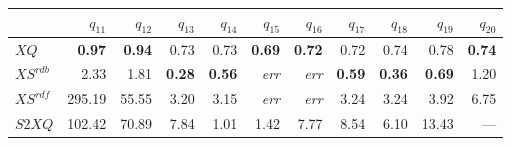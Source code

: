 \begin{tabular}{lrrrrrrrrrr}
\toprule
  & $q_{11}$ & $q_{12}$ & $q_{13}$ & $q_{14}$ & $q_{15}$ & $q_{16}$ & $q_{17}$ & $q_{18}$ & $q_{19}$ & $q_{20}$ \\
\midrule
$\mathit{XQ}$        & \textbf{0.97}  & \textbf{0.94}  & 0.73   & 0.73   & \textbf{0.69}   & \textbf{0.72}   & 0.72   & 0.74   & 0.78   & \textbf{0.74}  \\[0.15em]
$\mathit{XS^{rdb}}$  & 2.33   & 1.81   & \textbf{0.28}  & \textbf{0.56}  & \textit{err}  & \textit{err}  & \textbf{0.59}  & \textbf{0.36}  & \textbf{0.69}  & 1.20   \\[0.15em]
$\mathit{XS^{rdf}}$  & 295.19   & 55.55   & 3.20   & 3.15   & \textit{err} & \textit{err} & 3.24   & 3.24   & 3.92   & 6.75   \\[0.15em]
$\mathit{S2XQ}$      & 102.42   & 70.89   & 7.84   & 1.01   & 1.42   & 7.77   & 8.54   & 6.10   & 13.43   &  --- \\[0.15em]
\bottomrule
\end{tabular}
